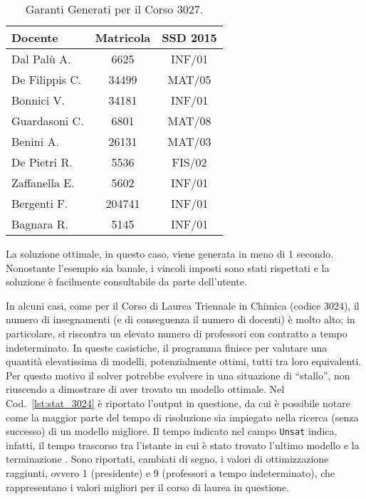 \begin{table}[!ht]
    \caption{Garanti Generati per il Corso 3027.}
    \centering
    \begin{tabular}{l c c}
        \toprule
        \textbf{Docente} & \textbf{Matricola} & \textbf{SSD 2015} \\
        \midrule
        Dal Palù A. & 6625 & INF/01 \\
        De Filippis C. & 34499 & MAT/05 \\
        Bonnici V. & 34181 & INF/01 \\
        Guardasoni C. & 6801 & MAT/08 \\
        Benini A. & 26131 & MAT/03 \\
        De Pietri R. & 5536 & FIS/02 \\
        Zaffanella E. & 5602 & INF/01 \\
        Bergenti F. & 204741 & INF/01 \\
        Bagnara R. & 5145 & INF/01 \\
        \bottomrule
    \end{tabular}
    \label{tab:garanti}
\end{table}

La soluzione ottimale, in questo caso, viene generata in meno di 1 secondo. 
Nonostante l'esempio sia banale, i vincoli imposti sono stati rispettati 
e la soluzione è facilmente consultabile da parte dell'utente.

In alcuni casi, come per il Corso di Laurea Triennale in Chimica (codice 3024), 
il numero di insegnamenti (e di conseguenza il numero di docenti) è molto 
alto; in particolare, si riscontra un elevato numero di professori con contratto
a tempo indeterminato. In queste casistiche, il programma finisce per valutare una quantità elevatissima 
di modelli, potenzialmente ottimi, tutti tra loro equivalenti. Per questo 
motivo il solver potrebbe evolvere in una situazione di ``stallo'', non 
riuscendo a dimostrare di aver trovato un modello ottimale. Nel Cod.~\ref{lst:stat_3024} è riportato l'output in questione, da cui è 
possibile notare come la maggior parte del tempo di risoluzione sia impiegato nella 
ricerca (senza successo) di un modello migliore. Il tempo indicato nel campo \texttt{Unsat} indica, infatti, il tempo trascorso tra 
l'istante in cui è stato trovato l'ultimo modello e la terminazione \cite{gebser2015potassco}.
Sono riportati, cambiati di segno, i valori di ottimizzazione raggiunti, ovvero 1 (presidente) e 
9 (professori a tempo indeterminato), che rappresentano i valori migliori per il corso di laurea in questione. 

